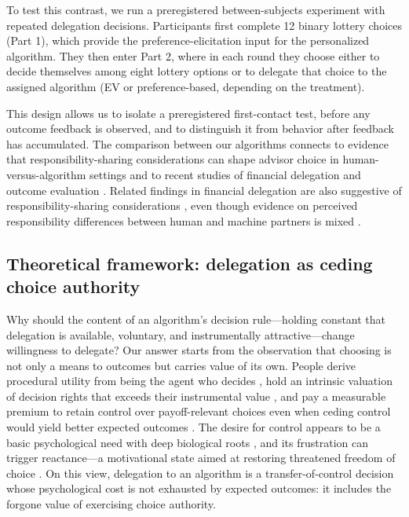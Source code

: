 \documentclass[a4paper, 12pt, fleqn]{article}
\theoremstyle{definition}
\begin{document}
To test this contrast, we run a preregistered between-subjects experiment with repeated delegation decisions. Participants first complete 12 binary lottery choices (Part 1), which provide the preference-elicitation input for the personalized algorithm. They then enter Part 2, where in each round they choose either to decide themselves among eight lottery options or to delegate that choice to the assigned algorithm (EV or preference-based, depending on the treatment). 

This design allows us to isolate a preregistered first-contact test, before any outcome feedback is observed, and to distinguish it from behavior after feedback has accumulated. 
The comparison between our algorithms connects to evidence that responsibility-sharing considerations can shape advisor choice in human-versus-algorithm settings \citep{Gazit2023} and to recent studies of financial delegation and outcome evaluation \citep{Ismagilova2025}. Related findings in financial delegation are also suggestive of responsibility-sharing considerations \citep{Werner2026}, even though evidence on perceived responsibility differences between human and machine partners is mixed \citep{Kirchkamp2019}.

\subsection*{Theoretical framework: delegation as ceding choice authority}
Why should the content of an algorithm's decision rule---holding constant that delegation is available, voluntary, and instrumentally attractive---change willingness to delegate? Our answer starts from the observation that choosing is not only a means to outcomes but carries value of its own. People derive procedural utility from being the agent who decides \citep{FreyBenzStutzer2004}, 
hold an intrinsic valuation of decision rights that exceeds their instrumental value \citep{Bartling2014}, and pay a measurable premium to retain control over payoff-relevant choices even when ceding control would yield better expected outcomes \citep{Owens2014}. The desire for control appears to be a basic psychological need with deep biological roots \citep{Leotti2010}, and its frustration can trigger reactance---a motivational state aimed at restoring threatened freedom of choice \citep{Brehm1966}. On this view, delegation to an algorithm is a transfer-of-control decision \citep{Candrian2022} whose psychological cost is not exhausted by expected outcomes: it includes the forgone value of exercising choice authority.
\end{document}
